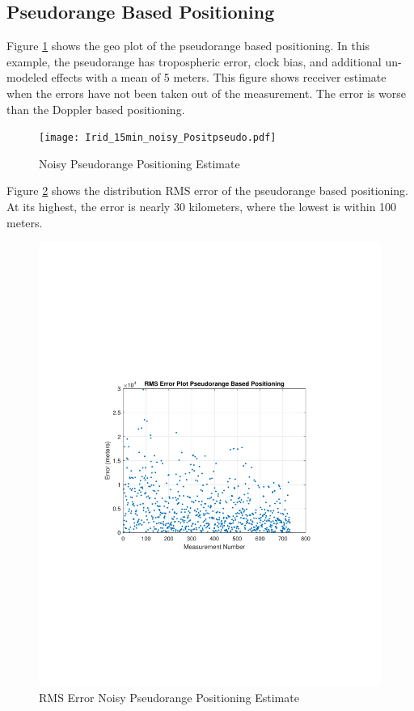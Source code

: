 \documentclass[12pt]{report}
\begin{document}
\subsection{Pseudorange Based Positioning}
Figure \ref{fig:DirtyPseudorange15minIridPosit} shows the geo plot of the pseudorange based positioning. In this example, the pseudorange has tropospheric error, clock bias, and additional un-modeled effects with a mean of 5 meters. This figure shows receiver estimate when the errors have not been taken out of the measurement. The error is worse than the Doppler based positioning. 
\begin{figure}[h!]
    \centering
    \texttt{[image: Irid\_15min\_noisy\_Positpseudo.pdf]}
    \caption{Noisy Pseudorange Positioning Estimate}
    \label{fig:DirtyPseudorange15minIridPosit}
\end{figure}
Figure \ref{fig:DirtyPseudorange15minIridPositrmse} shows the distribution RMS error of the pseudorange based positioning. At its highest, the error is nearly 30 kilometers, where the lowest is within 100 meters. 
\begin{figure}[h!]
    \centering
    \includegraphics[trim=1.2in 3.3in 1.75in 3.3in,clip,width=5in]
    {Irid_15min_noisy_RMSEpseudo.pdf}
    \caption{RMS Error Noisy Pseudorange Positioning Estimate}
    \label{fig:DirtyPseudorange15minIridPositrmse}
\end{figure}
\end{document}
